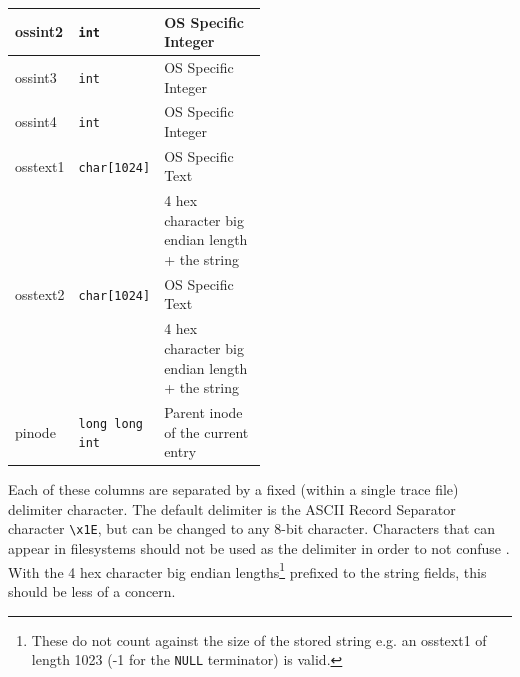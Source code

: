 \begin{longtable}{|l|l|p{0.5\linewidth}|}
  \hline
  ossint2 & \texttt{int} & OS Specific Integer \\
  \hline
  ossint3 & \texttt{int} & OS Specific Integer \\
  \hline
  ossint4 & \texttt{int} & OS Specific Integer \\
  \hline
  osstext1 & \texttt{char[1024]} & OS Specific Text \\
  & & 4 hex character big endian length + the string \\
  \hline
  osstext2 & \texttt{char[1024]} & OS Specific Text \\
  & & 4 hex character big endian length + the string \\
  \hline
  pinode & \texttt{long long int} & Parent inode of the current entry \\
  \hline
\end{longtable}

Each of these columns are separated by a fixed (within a single trace
file) delimiter character. The default delimiter is the ASCII Record
Separator character \texttt{\textbackslash x1E}, but can be changed to
any 8-bit character. Characters that can appear in filesystems should
not be used as the delimiter in order to not confuse \gufitraceindex.
With the 4 hex character big endian lengths\footnote{These do not
count against the size of the stored string e.g. an osstext1 of length
1023 (-1 for the \texttt{NULL} terminator) is valid.} prefixed to the
string fields, this should be less of a concern.

